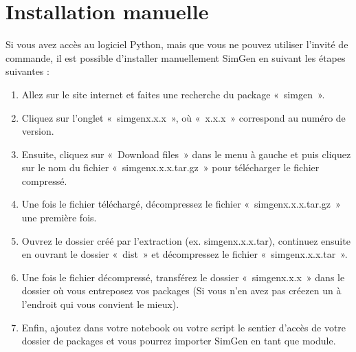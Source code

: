 \documentclass[letterpaper,10pt,french]{sphinxmanual}
\begin{document}
\section{Installation manuelle}
\label{\detokenize{installation:installation-manuelle}}
Si vous avez accès au logiciel Python, mais que vous ne pouvez utiliser l’invité de commande,
il est possible d’installer manuellement SimGen en suivant les étapes suivantes :
\begin{enumerate}
%
\item {} 
Allez sur le site internet  et faites une recherche du package « simgen ».

\item {} 
Cliquez sur l’onglet « simgen\sphinxhyphen{}x.x.x », où « x.x.x » correspond au numéro de version.

\item {} 
Ensuite, cliquez sur « Download files » dans le menu à gauche et puis cliquez sur le nom du fichier « simgen\sphinxhyphen{}x.x.x.tar.gz » pour télécharger le fichier compressé.

\item {} 
Une fois le fichier téléchargé, décompressez le fichier « simgen\sphinxhyphen{}x.x.x.tar.gz » une première fois.

\item {} 
Ouvrez le dossier créé par l’extraction (ex. simgen\sphinxhyphen{}x.x.x.tar), continuez ensuite en ouvrant le dossier « dist » et décompressez le fichier « simgen\sphinxhyphen{}x.x.x.tar ».

\item {} 
Une fois le fichier décompressé, transférez le dossier « simgen\sphinxhyphen{}x.x.x » dans le dossier où vous entreposez vos packages (Si vous n’en avez pas créez\sphinxhyphen{}en un à l’endroit qui vous convient le mieux).

\item {} 
Enfin, ajoutez dans votre notebook ou votre script le sentier d’accès de votre dossier de packages et vous pourrez importer SimGen en tant que module.

\end{enumerate}

\begin{sphinxVerbatim}[commandchars=\\\{\}]
 

 
\end{sphinxVerbatim}
\end{document}

